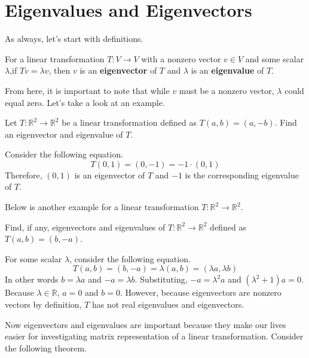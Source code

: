 \documentclass[../../main.tex]{subfiles}
\begin{document}
\section{Eigenvalues and Eigenvectors}

As always, let's start with definitions.

\begin{definition}{}{}
For a linear transformation $T: V \to V$ with a nonzero vector
$v \in V$ and some scalar $\lambda$,if $Tv = \lambda v$, then
$v$ is an \textbf{eigenvector} of $T$ and $\lambda$ is an
\textbf{eigenvalue} of $T$.
\end{definition}

From here, it is important to note that while $v$ must be a
nonzero vector, $\lambda$ could equal zero. Let's take a look
at an example.

\begin{problem}{}{}
Let $T: \mathbb{R}^2 \to \mathbb{R}^2$ be a linear transformation
defined as $T(a, b) = (a, - b)$. Find an eigenvector and eigenvalue
of $T$.
\end{problem}
\begin{solution}
Consider the following equation.
\[
T(0, 1) = (0, -1) = -1 \cdot (0, 1)
\]
Therefore, $(0, 1)$ is an eigenvector of $T$ and $-1$ is the
corresponding eigenvalue of $T$.
\end{solution}

Below is another example for a linear transformation $T: \mathbb{R}^2
\to \mathbb{R}^2$.

\begin{problem}{}{}
Find, if any, eigenvectors and eigenvalues of $T: \mathbb{R}^2 \to
\mathbb{R}^2$ defined as $T(a, b) = (b, -a)$.
\end{problem}
\begin{solution}
For some scalar $\lambda$, consider the following equation.
\[
T(a, b) = (b, -a) = \lambda (a, b) = (\lambda a, \lambda b)
\]
In other words $b = \lambda a$ and $-a = \lambda b$. Substituting,
$-a = \lambda^2 a$ and $(\lambda^2 + 1) a = 0$. Because $\lambda \in
\mathbb{R}$, $a = 0$ and $b = 0$. However, because eigenvectors
are nonzero vectors by definition, $T$ has not real eigenvalues
and eigenvectors.
\end{solution}

Now eigenvectors and eigenvalues are important because they make
our lives easier for investigating matrix representation of a
linear transformation. Consider the following theorem.
\end{document}
